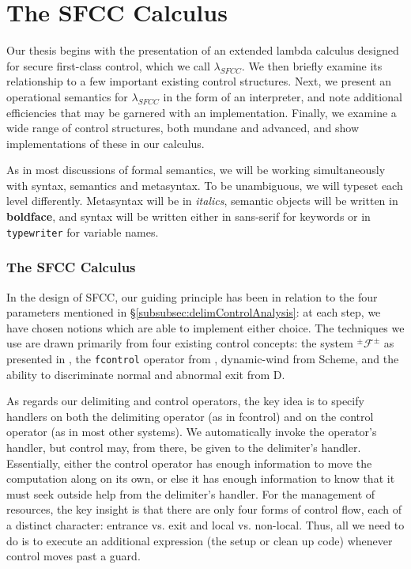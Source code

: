 \documentclass[11pt]{article}
\newcommand{\maybePage}{\newpage}
\newcommand\F{\mathcal{F}}
\newcommand\pmFpm{^\pm\F^\pm}
\begin{document}



\maybePage
\part{The SFCC Calculus}

Our thesis begins with the presentation of an extended lambda calculus designed for secure first-class control, which we call $\lambda_{SFCC}$.
We then briefly examine its relationship to a few important existing control structures.
Next, we present an operational semantics for $\lambda_{SFCC}$ in the form of an interpreter, and note additional efficiencies that may be garnered with an implementation.
Finally, we examine a wide range of control structures, both mundane and advanced, and show implementations of these in our calculus.

As in most discussions of formal semantics, we will be working simultaneously with syntax, semantics and metasyntax. To be unambiguous, we will typeset each level differently. Metasyntax will be in \textit{italics}, semantic objects will be written in \textbf{boldface}, and syntax will be written either in \textsf{sans-serif} for keywords or in \texttt{typewriter} for variable names.





\maybePage
\section{The SFCC Calculus}
\label{sec:SFCCcalculus}

In the design of SFCC, our guiding principle has been in relation to the four parameters mentioned in \S\ref{subsubsec:delimControlAnalysis}:
at each step, we have chosen notions which are able to implement either choice.
The techniques we use are drawn primarily from four existing control concepts:
the system $\pmFpm$ as presented in \cite{MFDC}, the \texttt{fcontrol} operator from \cite{HandlingControl}, dynamic-wind from Scheme, and the ability to discriminate normal and abnormal exit from D.

As regards our delimiting and control operators, the key idea is to specify handlers on both the delimiting operator (as in fcontrol) and on the control operator (as in most other systems).
We automatically invoke the operator's handler, but control may, from there, be given to the delimiter's handler.
Essentially, either the control operator has enough information to move the computation along on its own, or else it has enough information to know that it must seek outside help from the delimiter's handler.
For the management of resources, the key insight is that there are only four forms of control flow, each of a distinct character: entrance vs. exit and local vs. non-local.
Thus, all we need to do is to execute an additional expression (the setup or clean up code) whenever control moves past a guard.
\end{document}
